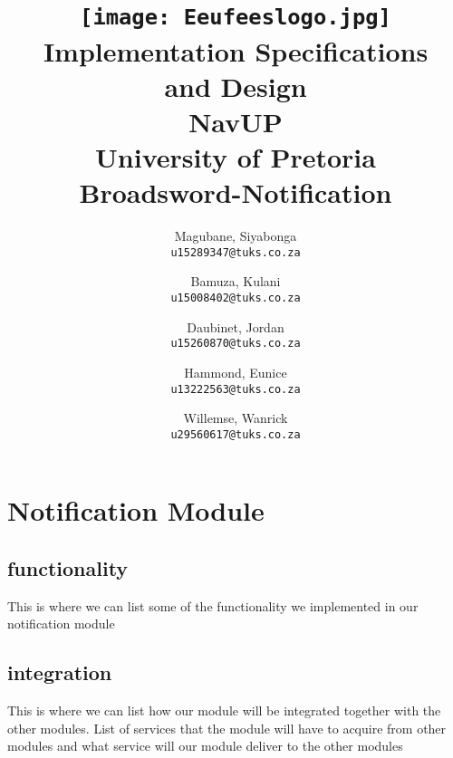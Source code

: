 \documentclass{article}
\title{\texttt{[image: Eeufeeslogo.jpg]} \\
	\vspace{1.0cm}
	Implementation Specifications \\ 
	and Design \\
	\vspace{0.5cm}
	NavUP \\
	University of Pretoria \\
	\vspace{0.5cm}
	\vspace{8.0cm}
	Broadsword-Notification\\
	\vspace{0.5cm}
}
\author{
	Magubane, Siyabonga\\
	\texttt{u15289347@tuks.co.za}
	\and
	Bamuza, Kulani\\
	\texttt{u15008402@tuks.co.za}
	\and
	Daubinet, Jordan\\
	\texttt{u15260870@tuks.co.za}
	\and
	Hammond, Eunice\\
	\texttt{u13222563@tuks.co.za}
	\and
	Willemse, Wanrick \\
	\texttt{u29560617@tuks.co.za}
	\vspace{0.5cm}
	}
\begin{document}
	\maketitle
	\thispagestyle{empty}
	\clearpage
	
	\newpage
	\thispagestyle{empty}
	\clearpage
	
	\newpage
	
  \section{Notification Module}
  
  \subsection{functionality}
This is where we can list some of the functionality we implemented          in our notification module
  \subsection{integration}
This is where we can list how our module will be integrated     together with the other modules. List of  services that the module will have to acquire from other modules and what service will our module deliver to the other modules
			
\end{document}
